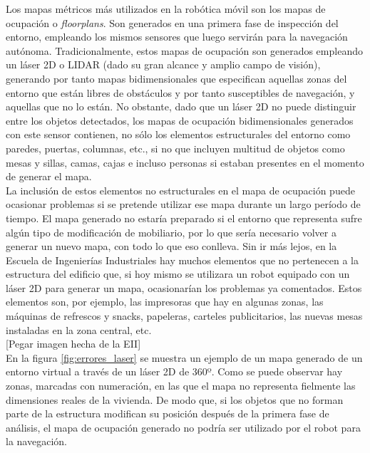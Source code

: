 Los mapas métricos más utilizados en la robótica móvil son los mapas de ocupación o \textit{floorplans}. Son generados en una primera fase de inspección del entorno, empleando los mismos sensores que luego servirán para la navegación autónoma. Tradicionalmente, estos mapas de ocupación son generados empleando un láser 2D o LIDAR (dado su gran alcance y amplio campo de visión), generando por tanto mapas bidimensionales que especifican aquellas zonas del entorno que están libres de obstáculos y por tanto susceptibles de navegación, y aquellas que no lo están. No obstante, dado que un láser 2D no puede distinguir entre los objetos detectados, los mapas de ocupación bidimensionales generados con este sensor contienen, no sólo los elementos estructurales del entorno como paredes, puertas, columnas, etc., si no que incluyen multitud de objetos como mesas y sillas, camas, cajas e incluso personas si estaban presentes en el momento de generar el mapa.\\

La inclusión de estos elementos no estructurales en el mapa de ocupación puede ocasionar problemas si se pretende utilizar ese mapa durante un largo período de tiempo. El mapa generado no estaría preparado si el entorno que representa sufre algún tipo de modificación de mobiliario, por lo que sería necesario volver a generar un nuevo mapa, con todo lo que eso conlleva. Sin ir más lejos, en la Escuela de Ingenierías Industriales hay muchos elementos que no pertenecen a la estructura del edificio que, si hoy mismo se utilizara un robot equipado con un láser 2D para generar un mapa, ocasionarían los problemas ya comentados. Estos elementos son, por ejemplo, las impresoras que hay en algunas zonas, las máquinas de refrescos y snacks, papeleras, carteles publicitarios, las nuevas mesas instaladas en la zona central, etc.\\

[Pegar imagen hecha de la EII]\\

En la figura \ref{fig:errores_laser} se muestra un ejemplo de un mapa generado de un entorno virtual a través de un láser 2D de 360º. Como se puede observar hay zonas, marcadas con numeración, en las que el mapa no representa fielmente las dimensiones reales de la vivienda. De modo que, si los objetos que no forman parte de la estructura modifican su posición después de la primera fase de análisis, el mapa de ocupación generado no podría ser utilizado por el robot para la navegación. \\

